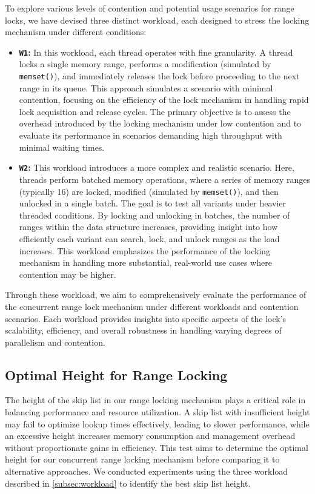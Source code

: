 To explore various levels of contention and potential usage scenarios for range locks, we have devised three distinct workload, each designed to stress the locking mechanism under different conditions:

\begin{itemize} 
    \item \textbf{\texttt{W1}:} In this workload, each thread operates with fine granularity. A thread locks a single memory range, performs a modification (simulated by \texttt{memset()}), and immediately releases the lock before proceeding to the next range in its queue. This approach simulates a scenario with minimal contention, focusing on the efficiency of the lock mechanism in handling rapid lock acquisition and release cycles. The primary objective is to assess the overhead introduced by the locking mechanism under low contention and to evaluate its performance in scenarios demanding high throughput with minimal waiting times.
    
    \item \textbf{\texttt{W2}:} This workload introduces a more complex and realistic scenario. Here, threads perform batched memory operations, where a series of memory ranges (typically 16) are locked, modified (simulated by \texttt{memset()}), and then unlocked in a single batch. The goal is to test all variants under heavier threaded conditions. By locking and unlocking in batches, the number of ranges within the data structure increases, providing insight into how efficiently each variant can search, lock, and unlock ranges as the load increases. This workload emphasizes the performance of the locking mechanism in handling more substantial, real-world use cases where contention may be higher.
\end{itemize}

Through these workload, we aim to comprehensively evaluate the performance of the concurrent range lock mechanism under different workloads and contention scenarios. Each workload provides insights into specific aspects of the lock's scalability, efficiency, and overall robustness in handling varying degrees of parallelism and contention.

\subsection{Optimal Height for Range Locking}

The height of the skip list in our range locking mechanism plays a critical role in balancing performance and resource utilization. A skip list with insufficient height may fail to optimize lookup times effectively, leading to slower performance, while an excessive height increases memory consumption and management overhead without proportionate gains in efficiency. This test aims to determine the optimal height for our concurrent range locking mechanism before comparing it to alternative approaches. We conducted experiments using the three workload described in \ref{subsec:workload} to identify the best skip list height.

